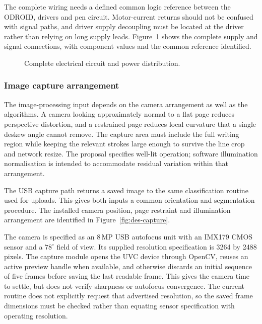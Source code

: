 The complete wiring needs a defined common logic reference between the ODROID, drivers and pen circuit. Motor-current returns should not be confused with signal paths, and driver supply decoupling must be located at the driver rather than relying on long supply leads. Figure~\ref{fig:des-complete-circuit} shows the complete supply and signal connections, with component values and the common reference identified.


\begin{figure}[!htbp]\centering
{}
\caption{Complete electrical circuit and power distribution.}
\label{fig:des-complete-circuit}
\end{figure}


\subsubsection{Image capture arrangement}
\label{sec:des-camera}
The image-processing input depends on the camera arrangement as well as the algorithms. A camera looking approximately normal to a flat page reduces perspective distortion, and a restrained page reduces local curvature that a single deskew angle cannot remove. The capture area must include the full writing region while keeping the relevant strokes large enough to survive the line crop and network resize. The proposal specifies well-lit operation; software illumination normalisation is intended to accommodate residual variation within that arrangement.


The USB capture path returns a saved image to the same classification routine used for uploads. This gives both inputs a common orientation and segmentation procedure. The installed camera position, page restraint and illumination arrangement are identified in Figure~\ref{fig:des-capture}.

The camera is specified as an 8\,MP USB autofocus unit with an IMX179 CMOS sensor and a $78^\circ$ field of view. Its supplied resolution specification is 3264 by 2488 pixels. The capture module opens the UVC device through OpenCV, reuses an active preview handle when available, and otherwise discards an initial sequence of five frames before saving the last readable frame. This gives the camera time to settle, but does not verify sharpness or autofocus convergence. The current routine does not explicitly request that advertised resolution, so the saved frame dimensions must be checked rather than equating sensor specification with operating resolution.


